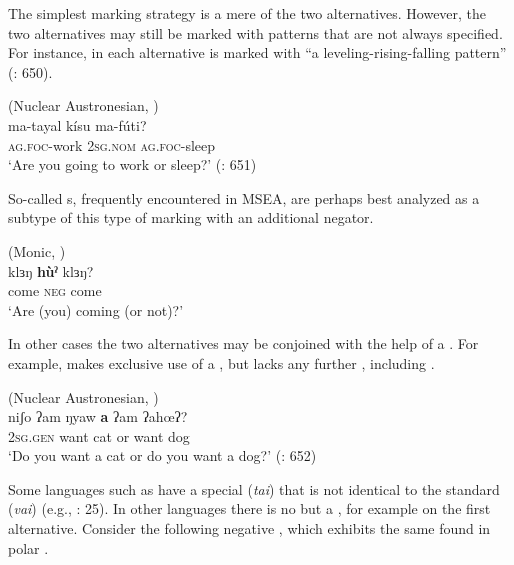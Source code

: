 The simplest marking strategy is a mere  of the two alternatives. However, the two alternatives may still be marked with  patterns that are not always specified. For instance, in   each alternative is marked with “a leveling-rising-falling  pattern” (\citealt{Huang1999}: 650).

\ea%
    \label{ex:4:13}
     (Nuclear Austronesian, )\\
    \gll ma-tayal  kísu    ma-fúti?\\
    \textsc{ag.foc}-work  2\textsc{sg.nom}  \textsc{ag.foc}-sleep\\
    \glt ‘Are you going to work or sleep?’ (\citealt{Huang1999}: 651)
    \z

So-called s, frequently encountered in MSEA, are perhaps best analyzed as a subtype of this type of  marking with an additional negator.

\ea%
    \label{ex:4:14}
     (Monic, )\\
    \gll klɜŋ \textbf{{hùˀ}} klɜŋ?\\
    come  \textsc{neg}  come\\
    \glt ‘Are (you) coming (or not)?’ \citep[60]{Clark1985}
    \z

In other cases the two alternatives may be conjoined with the help of a . For example,   makes exclusive use of a , but lacks any further , including .

\newpage 
\ea%
    \label{ex:4:15}
     (Nuclear Austronesian, )\\
    \gll niʃo    ʔam  ŋyaw \textbf{{a}} ʔam  ʔahœʔ?\\
    2\textsc{sg.gen}  want  cat  or  want  dog\\
    \glt ‘Do you want a cat or do you want a dog?’ (\citealt{Huang1999}: 652)
    \z

Some languages such as  have a special   (\textit{tai}) that is not identical to the standard  (\textit{vai}) (e.g., \citealt{Haspelmath2007}: 25). In other languages there is no  but a , for example on the first alternative. Consider the following negative  , which exhibits the same  found in polar .

